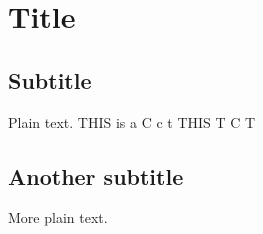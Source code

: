\documentclass{article}
\begin{document}
\section{Title}

\subsection{Subtitle}

Plain text. THIS is a C c t THIS T C T 
   
\subsection{Another subtitle}        

More plain text.
 
\end{document}
